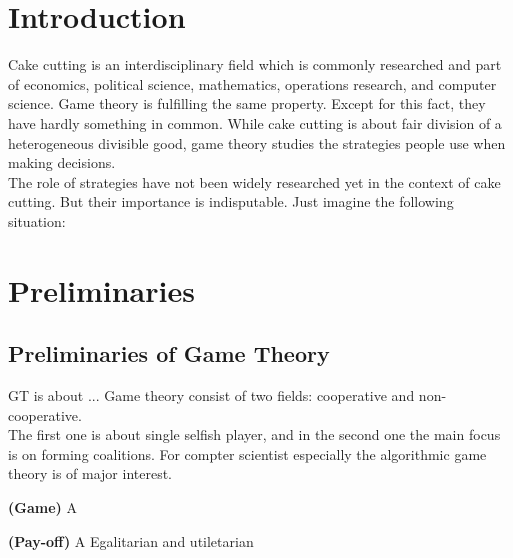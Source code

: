 


\section{Introduction}
Cake cutting is an interdisciplinary field which is commonly researched and part of economics, political science, mathematics, operations research, and computer science. Game theory is fulfilling the same property. Except for this fact, they have hardly something in common. While cake cutting is about fair division of a heterogeneous divisible good, game theory studies the strategies people use when making decisions.\\
The role of strategies have not been widely researched yet in the context of cake cutting. But their importance is indisputable. Just imagine the following situation:
\\
\newline
\pagebreak

\section{Preliminaries}
\subsection{Preliminaries of Game Theory}
GT is about ... 
Game theory consist of two fields: cooperative and non-cooperative.\\ The first one is about single selfish player, and in the second one the main focus is on forming coalitions. For compter scientist especially the algorithmic game theory is of major interest. 
\begin{defi}{\textbf{(Game)}}
A 
\end{defi}
\begin{defi}{\textbf{(Pay-off)}}
A Egalitarian and utiletarian
\end{defi}

